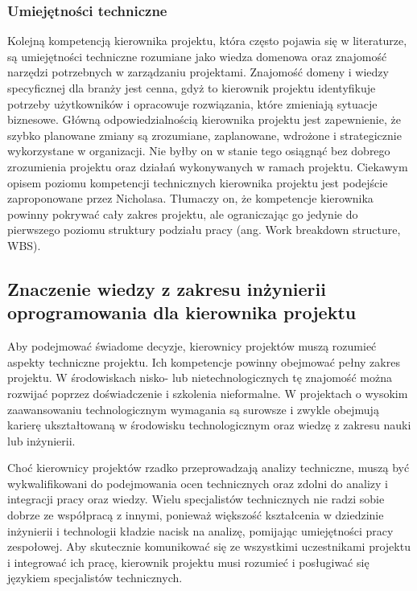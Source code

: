 \subsubsection{Umiejętności techniczne}
Kolejną kompetencją kierownika projektu, która często pojawia się w literaturze, są umiejętności techniczne rozumiane jako wiedza domenowa oraz znajomość narzędzi potrzebnych w zarządzaniu projektami. \autocite{arras2010} \autocite{brill}
Znajomość domeny i wiedzy specyficznej dla branży jest cenna, gdyż to kierownik projektu identyfikuje potrzeby użytkowników i opracowuje rozwiązania, które zmieniają sytuacje biznesowe. Główną odpowiedzialnością kierownika projektu jest zapewnienie, że szybko planowane zmiany są zrozumiane, zaplanowane, wdrożone i strategicznie wykorzystane w organizacji.\autocite{Gottschalk} Nie byłby on w stanie tego osiągnąć bez dobrego zrozumienia projektu oraz działań wykonywanych w ramach projektu.
Ciekawym opisem poziomu kompetencji technicznych kierownika projektu jest podejście zaproponowane przez Nicholasa. Tłumaczy on, że kompetencje kierownika powinny pokrywać cały zakres projektu, ale ograniczając go jedynie do pierwszego poziomu struktury podziału pracy (ang. Work breakdown structure, WBS).\autocite{NicholasSteyn}

\subsection{Znaczenie wiedzy z zakresu inżynierii oprogramowania dla kierownika projektu}
Aby podejmować świadome decyzje, kierownicy projektów muszą rozumieć aspekty techniczne projektu. Ich kompetencje powinny obejmować pełny zakres projektu. W środowiskach nisko- lub nietechnologicznych tę znajomość można rozwijać poprzez doświadczenie i szkolenia nieformalne. W projektach o wysokim zaawansowaniu technologicznym wymagania są surowsze i zwykle obejmują karierę ukształtowaną w środowisku technologicznym oraz wiedzę z zakresu nauki lub inżynierii.

Choć kierownicy projektów rzadko przeprowadzają analizy techniczne, muszą być wykwalifikowani do podejmowania ocen technicznych oraz zdolni do analizy i integracji pracy oraz wiedzy. Wielu specjalistów technicznych nie radzi sobie dobrze ze współpracą z innymi, ponieważ większość kształcenia w dziedzinie inżynierii i technologii kładzie nacisk na analizę, pomijając umiejętności pracy zespołowej. Aby skutecznie komunikować się ze wszystkimi uczestnikami projektu i integrować ich pracę, kierownik projektu musi rozumieć i posługiwać się językiem specjalistów technicznych.\autocite{NicholasSteyn}

